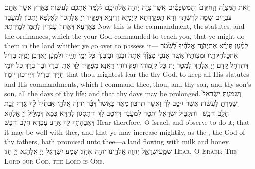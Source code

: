 \newperek
{}%
{וְזֹ֣את הַמִּצְוָ֗ה הַֽחֻקִּים֙ וְהַמִּשְׁפָּטִ֔ים אֲשֶׁ֥ר צִוָּ֛ה יְהֹוָ֥ה אֱלֹהֵיכֶ֖ם לְלַמֵּ֣ד אֶתְכֶ֑ם לַעֲשׂ֣וֹת בָּאָ֔רֶץ אֲשֶׁ֥ר אַתֶּ֛ם עֹבְרִ֥ים שָׁ֖מָּה לְרִשְׁתָּֽהּ׃}
{וְדָא תַּפְקֵידְתָּא קְיָמַיָּא וְדִינַיָּא דְּפַקֵּיד יְיָ אֱלָהֲכוֹן לְאַלָּפָא יָתְכוֹן לְמֶעֱבַד בְּאַרְעָא דְּאַתּוּן עָבְרִין לְתַמָּן לְמֵירְתַהּ׃}
{Now this is the commandment, the statutes, and the ordinances, which the \lord\space your God commanded to teach you, that ye might do them in the land whither ye go over to possess it—}{}
{לְמַ֨עַן תִּירָ֜א אֶת\maqqaf יְהֹוָ֣ה אֱלֹהֶ֗יךָ לִ֠שְׁמֹ֠ר אֶת\maqqaf כׇּל\maqqaf חֻקֹּתָ֣יו וּמִצְוֺתָיו֮ אֲשֶׁ֣ר אָנֹכִ֣י מְצַוֶּ֒ךָ֒ אַתָּה֙ וּבִנְךָ֣ וּבֶן\maqqaf בִּנְךָ֔ כֹּ֖ל יְמֵ֣י חַיֶּ֑יךָ וּלְמַ֖עַן יַאֲרִכֻ֥ן יָמֶֽיךָ׃}
{בְּדִיל דְּתִדְחַל קֳדָם יְיָ אֱלָהָךְ לְמִטַּר יָת כָּל קְיָמוֹהִי וּפִקּוֹדוֹהִי דַּאֲנָא מְפַקֵּיד לָךְ אַתְּ וּבְרָךְ וּבַר בְּרָךְ כֹּל יוֹמֵי חַיָּיךְ וּבְדִיל דְּיֵירְכוּן יוֹמָךְ׃}
{that thou mightest fear the \lord\space thy God, to keep all His statutes and His commandments, which I command thee, thou, and thy son, and thy son’s son, all the days of thy life; and that thy days may be prolonged.}{}
{וְשָׁמַעְתָּ֤ יִשְׂרָאֵל֙ וְשָׁמַרְתָּ֣ לַעֲשׂ֔וֹת אֲשֶׁר֙ יִיטַ֣ב לְךָ֔ וַאֲשֶׁ֥ר תִּרְבּ֖וּן מְאֹ֑ד כַּאֲשֶׁר֩ דִּבֶּ֨ר יְהֹוָ֜ה אֱלֹהֵ֤י אֲבֹתֶ֙יךָ֙ לָ֔ךְ אֶ֛רֶץ זָבַ֥ת חָלָ֖ב וּדְבָֽשׁ׃ \petucha }
{וּתְקַבֵּיל יִשְׂרָאֵל וְתִטַּר לְמֶעֱבַד דְּיִיטַב לָךְ וּדְתִּסְגוֹן לַחְדָּא כְּמָא דְּמַלֵּיל יְיָ אֱלָהָא דַּאֲבָהָתָךְ לָךְ אֲרַע עָבְדָא חֲלָב וּדְבַשׁ׃}
{Hear therefore, O Israel, and observe to do it; that it may be well with thee, and that ye may increase mightily, as the \lord, the God of thy fathers, hath promised unto thee—a land flowing with milk and honey.}{}
{שְׁמַ֖\large ע\normalsize\space יִשְׂרָאֵ֑ל יְהֹוָ֥ה אֱלֹהֵ֖ינוּ יְהֹוָ֥ה \pasek  אֶחָֽ\large ד\normalsize ׃}
{שְׁמַע יִשְׂרָאֵל יְיָ אֱלָהַנָא יְיָ חַד׃}
{\textsc{Hear, O Israel: The Lord our God, the Lord is One.}}{}
